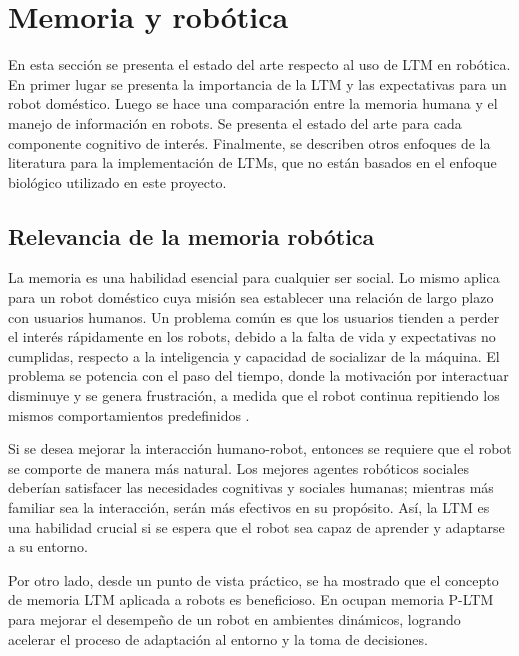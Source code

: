 
\section{Memoria y robótica}

En esta sección se presenta el estado del arte respecto al uso de LTM en robótica. En primer lugar se presenta la importancia de la LTM y las expectativas para un robot doméstico. Luego se hace una comparación entre la memoria humana y el manejo de información en robots.  Se presenta el estado del arte para cada componente cognitivo de interés. Finalmente, se describen otros enfoques de la literatura para la implementación de LTMs, que no están basados en el enfoque biológico utilizado en este proyecto.


\subsection{Relevancia de la memoria robótica}

La memoria es una habilidad esencial para cualquier ser social. Lo mismo aplica para un robot doméstico cuya misión sea establecer una relación de largo plazo con usuarios humanos. Un problema común es que los usuarios tienden a perder el interés rápidamente en los robots, debido a la falta de vida y expectativas no cumplidas, respecto a la inteligencia y capacidad de socializar de la máquina. El problema se potencia con el paso del tiempo, donde la motivación por interactuar disminuye y se genera frustración, a medida que el robot continua repitiendo los mismos comportamientos predefinidos \cite{Ho2009}.

Si se desea mejorar la interacción humano-robot, entonces se requiere que el robot se comporte de manera más natural. Los mejores agentes robóticos sociales deberían satisfacer las necesidades cognitivas y sociales humanas; mientras más familiar sea la interacción, serán más efectivos en su propósito. Así, la LTM es una habilidad crucial si se espera que el robot sea capaz de aprender y adaptarse a su entorno.


Por otro lado, desde un punto de vista práctico, se ha mostrado que el concepto de memoria LTM aplicada a robots es beneficioso. En \cite{Salgado2012} ocupan memoria P-LTM para mejorar el desempeño de un robot en ambientes dinámicos, logrando acelerar el proceso de adaptación al entorno y la toma de decisiones.

